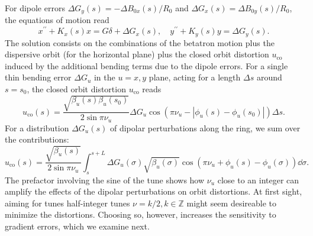     For dipole errors $\Delta G_y(s)=-\Delta B_{0x}(s)/R_0$ and $\Delta G_x(s)=\Delta B_{0y}(s)/R_0$, the equations of motion read
    \begin{equation}
        x^{\prime\prime}+K_x(s)x=G\delta + \Delta G_x(s), \quad
        y^{\prime\prime}+K_y(s)y = \Delta G_y(s).
        \label{eq:dip_errEOM}
    \end{equation}
    The solution consists on the combinations of the betatron motion plus the dispersive orbit (for the horizontal plane) plus the closed orbit distortion $u_{\text{co}}$ induced by the additional bending terms due to the dipole errors. For a single thin bending error $\Delta G_u$ in the $u=x,y$ plane, acting for a length $\Delta s$ around $s=s_0$, the closed orbit distortion $u_{\text{co}}$ reads
    \begin{equation}
        u_{\text{co}}(s) = \frac{\sqrt{\beta_u(s)\beta_u(s_0)}}{2\sin\pi\nu_u}\Delta G_u\cos( \pi\nu_u - |\phi_u(s)-\phi_u(s_0)|)\Delta s.
        \label{eq:cod}
    \end{equation}
    For a distribution $\Delta G_u(s)$ of dipolar perturbations along the ring, we sum over the contributions:
    \begin{equation}
        u_{\text{co}}(s) = \frac{\sqrt{\beta_u(s)}}{2\sin\pi\nu_u}\int_{s}^{s+L} \Delta G_u(\sigma)\sqrt{\beta_u(\sigma)}\cos(\pi\nu_u + \phi_u(s) - \phi_u(\sigma))\dd{\sigma}.
        \label{eq:co_dist}
    \end{equation}
    The prefactor involving the sine of the tune shows how $\nu_{u}$ close to an integer can amplify the effects of the dipolar perturbations on orbit distortions. At first sight, aiming for tunes half-integer tunes $\nu=k/2, k\in\mathbb{Z}$ might seem desireable to minimize the distortions. Choosing so, however, increases the sensitivity to gradient errors, which we examine next.


